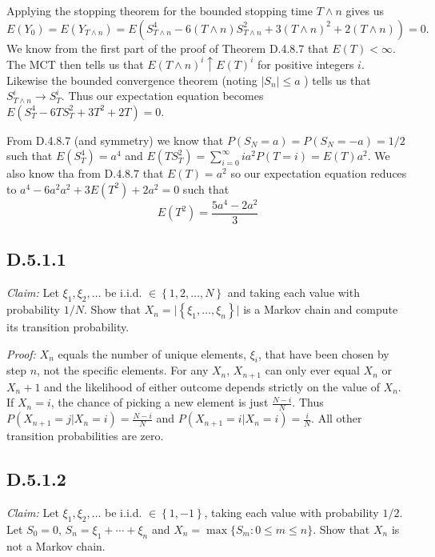 \documentclass[10pt]{article}
\begin{document}
Applying the stopping theorem for the bounded stopping time $T \wedge n$
gives us
\begin{equation*}
  E(Y_0) = E(Y_{T \wedge n}) = E(S_{T \wedge n}^4 
- 6(T \wedge n)S_{T \wedge n}^2 + 3(T \wedge n)^2 + 2(T \wedge n)) = 0.
\end{equation*}
We know from the first part of the proof of Theorem D.4.8.7 that $E(T) < \infty$.
The MCT then tells us that $E(T \wedge n)^i \uparrow E(T)^i$ for positive integers $i$.
Likewise the bounded convergence theorem (noting $\vert S_n \vert \le a$ )
tells us that $S_{T \wedge n}^i \to S_T^i$.
Thus our expectation equation becomes $E(S_{T}^4 - 6TS_{T}^2 + 3T^2 + 2T) = 0$.

From D.4.8.7 (and symmetry) we know that $P(S_N = a) = P(S_N = -a) = 1/2$
such that $E(S_{T}^4) = a^4$ and $E(TS_{T}^2) = \sum_{i=0}^\infty i a^2 P(T=i) = E(T)a^2$.
We also know tha from D.4.8.7 that $E(T) = a^2$ so our expectation equation reduces to
$a^4 - 6 a^2 a^2 + 3E(T^2) + 2 a^2 = 0$ such that 
\begin{equation*}
  E(T^2) = \frac{5a^4-2a^2}{3}
\end{equation*}

\subsection*{D.5.1.1}
\textit{Claim:} Let $\xi_1, \xi_2, \dots$ be i.i.d. 
$\in \left\{1,2,\dots,N\right\}$ and taking each value with
probability $1/N$. Show that 
$X_n = \vert \left\{\xi_1, \dots, \xi_n\right\} \vert$
is a Markov chain and compute its transition probability.

\textit{Proof:} $X_n$ equals the number of unique elements, $\xi_i$,
that have been chosen by step $n$, not the specific elements.
For any $X_n$, $X_{n+1}$ can only ever equal $X_n$ or $X_n + 1$
and the likelihood of either outcome depends strictly on the value of $X_n$.
If $X_n = i$, the chance of picking a new element is just $\frac{N-i}{N}$.
Thus $P(X_{n+1} = j \vert X_n = i) = \frac{N-i}{N}$ and
$P(X_{n+1} = i \vert X_n = i) = \frac{i}{N}$. All other transition 
probabilities are zero.


\subsection*{D.5.1.2}
\textit{Claim:} Let $\xi_1, \xi_2, \dots$ be i.i.d.
$\in \left\{1,-1\right\}$, taking each value with probability $1/2$.
Let $S_0=0$, $S_n=\xi_1 + \cdots + \xi_n$ and $X_n = \max \{S_m:0\le m\le n\}$.
Show that $X_n$ is not a Markov chain.
\end{document}
